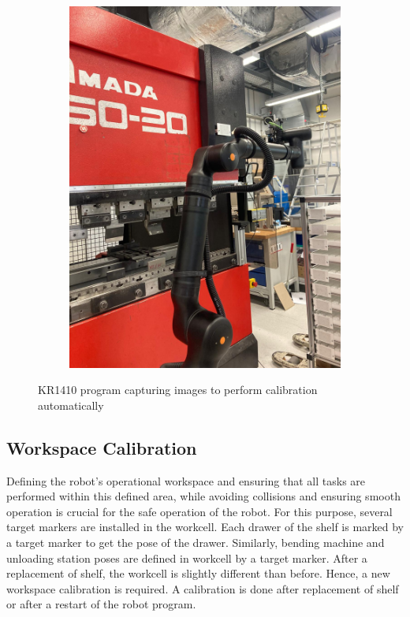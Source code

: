 \begin{figure}[h]
\begin{subfigure}{0.48\textwidth}
        \includegraphics[width=\textwidth, angle=0]{figures/001calibration/calibration-process-right.jpeg} %
        \label{fig:calibration-process-right}
    \end{subfigure}
    \caption{KR1410 program capturing images to perform calibration automatically}
    \label{fig:auto-calibration-process}
\end{figure}

\FloatBarrier
\subsection{Workspace Calibration}
\label{subsec:workspace-calibration}
Defining the robot's operational workspace and ensuring that all tasks are performed within this defined area, while avoiding collisions and ensuring smooth operation is crucial for the safe operation of the robot. For this purpose, several target markers are installed in the workcell. Each drawer of the shelf is marked by a target marker to get the pose of the drawer. Similarly, bending machine and unloading station poses are defined in workcell by a target marker. After a replacement of shelf, the workcell is slightly different than before. Hence, a new workspace calibration is required. A calibration is done after replacement of shelf or after a restart of the robot program.



